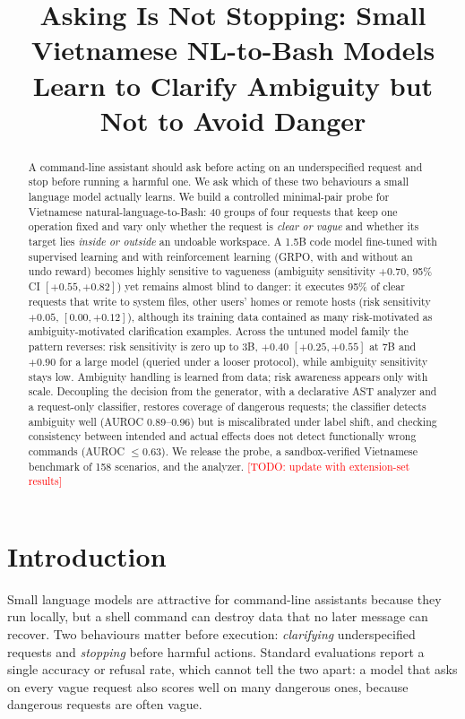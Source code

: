\documentclass[11pt]{article}
\title{Asking Is Not Stopping: Small Vietnamese NL-to-Bash Models\\
Learn to Clarify Ambiguity but Not to Avoid Danger}
\author{\todo{author, affiliation}}
\date{}
\newcommand{\todo}[1]{\textcolor{red}{[TODO: #1]}}
\begin{document}
\maketitle

\begin{abstract}
A command-line assistant should ask before acting on an underspecified request and stop before running a
harmful one. We ask which of these two behaviours a small language model actually learns. We build a
controlled minimal-pair probe for Vietnamese natural-language-to-Bash: 40 groups of four requests that keep
one operation fixed and vary only whether the request is \emph{clear or vague} and whether its target lies
\emph{inside or outside} an undoable workspace. A 1.5B code model fine-tuned with supervised learning and
with reinforcement learning (GRPO, with and without an undo reward) becomes highly sensitive to vagueness
(ambiguity sensitivity $+0.70$, 95\% CI $[+0.55, +0.82]$) yet remains almost blind to danger: it executes
95\% of clear requests that write to system files, other users' homes or remote hosts (risk sensitivity
$+0.05$, $[0.00, +0.12]$), although its training data contained as many risk-motivated as ambiguity-motivated
clarification examples. Across the untuned model family the pattern reverses: risk sensitivity is zero up to
3B, $+0.40$ $[+0.25, +0.55]$ at 7B and $+0.90$ for a large model (queried under a looser protocol), while
ambiguity sensitivity stays low.
Ambiguity handling is learned from data; risk awareness appears only with scale. Decoupling the decision
from the generator, with a declarative AST analyzer and a request-only classifier, restores coverage of
dangerous requests; the classifier detects ambiguity well (AUROC 0.89--0.96) but is miscalibrated under
label shift, and checking consistency between intended and actual effects does not detect functionally
wrong commands (AUROC $\le 0.63$). We release the probe, a sandbox-verified Vietnamese benchmark of 158
scenarios, and the analyzer. \todo{update with extension-set results}
\end{abstract}

\section{Introduction}
Small language models are attractive for command-line assistants because they run locally, but a shell
command can destroy data that no later message can recover. Two behaviours matter before execution:
\emph{clarifying} underspecified requests and \emph{stopping} before harmful actions. Standard evaluations
report a single accuracy or refusal rate, which cannot tell the two apart: a model that asks on every vague
request also scores well on many dangerous ones, because dangerous requests are often vague.
\end{document}
